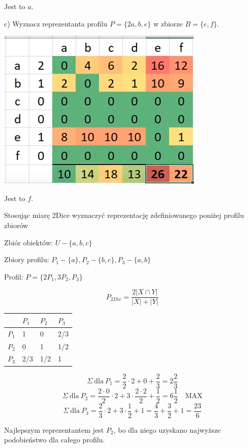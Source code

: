 \documentclass[12pt]{article}
\begin{document}
\begin{przyklad}
\begin{center}
        Jest to $a$.
    \end{center}

    c) Wyznacz reprezentanta profilu $ P = \{ 2a, b, e \} $ w zbiorze $ B = \{ e,f \}$.
    \begin{center}
        \includegraphics*[scale=0.5]{reprezentant.png}

        Jest to $f$.
    \end{center}
\end{przyklad}

\begin{przyklad}
    Stosując miarę 2Dice wyznaczyć reprezentację zdefiniowanego poniżej profilu zbiorów

    Zbiór obiektów: $ U - \{ a,b,c \} $

    Zbiory profilu: $ P_1 - \{a\}, P_2 - \{b,c\}, P_3 - \{a,b\} $

    Profil: $ P = \{ 2P_1, 3P_2, P_3 \} $

    \[ P_{2Dic} = \frac{2 |X \cap Y|}{|X| + |Y|} \]

    \begin{center}
        \begin{tabular}{l|lll}
            & $P_1$ & $P_2$ & $P_3$ \\ \hline
           $P_1$ & 1 & 0 & 2/3 \\
           $P_2$ & 0 & 1 & 1/2 \\
           $P_3$ & 2/3 & 1/2 & 1
       \end{tabular}
    \end{center}

    \[ \Sigma \ \text{dla} \ P_1 = \frac{2}{2} \cdot 2 + 0 + \frac{2}{3} = 2 \frac{2}{3} \]
    \[ \Sigma \ \text{dla} \ P_2 = \frac{2 \cdot 0}{2} \cdot 2 + 3 \cdot \frac{2 \cdot 2}{2} + \frac{1}{2} = 6 \frac{1}{2} \quad \text{MAX} \]
    \[ \Sigma \ \text{dla} \ P_3 = \frac{2}{3} \cdot 2 + 3 \cdot \frac{1}{2} + 1 = \frac{4}{3} + \frac{3}{2} + 1 = \frac{23}{6} \] 

    Najlepszym reprezentantem jest $P_2$, bo dla niego uzyskano najwyższe podobieństwo dla całego profilu.
\end{przyklad}
\end{document}
